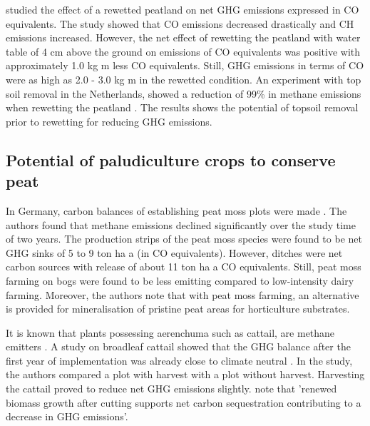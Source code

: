{%
\citet{van2013rewetting} studied the effect of a rewetted peatland on net GHG emissions expressed in CO equivalents. The study showed that CO emissions decreased drastically and CH emissions increased. However, the net effect of rewetting the peatland with water table of 4 cm above the ground on emissions of CO equivalents was positive with approximately 1.0 kg m less CO equivalents. Still, GHG emissions in terms of CO were as high as 2.0 - 3.0 kg m in the rewetted condition. An experiment with top soil removal in the Netherlands, showed a reduction of 99\% in methane emissions when rewetting the peatland \citep{harpenslager2015rewetting}. The results shows the potential of topsoil removal prior to rewetting for reducing GHG emissions. 

\subsection{Potential of paludiculture crops to conserve peat}
In Germany, carbon balances of establishing peat moss plots were made \citep{gunther2017greenhouse}. The authors found that methane emissions declined significantly over the study time of two years. The production strips of the peat moss  species were found to be net GHG sinks of 5 to 9 ton ha a (in CO equivalents). However, ditches were net carbon sources with release of about 11 ton ha a CO equivalents. Still, peat moss farming on bogs were found to be less emitting compared to low-intensity dairy farming. Moreover, the authors note that with peat moss farming, an alternative is provided for mineralisation of pristine peat areas for horticulture substrates.
 
It is known that plants possessing aerenchuma such as cattail, are methane emitters \citep{wichtmann2016paludiculture}. A study on broadleaf cattail showed that the GHG balance after the first year of implementation was already close to climate neutral \citep{guntherghgtypha}. In the study, the authors compared a plot with harvest with a plot without harvest. Harvesting the cattail proved to reduce net GHG emissions slightly. \citet{wichtmann2016paludiculture} note that 'renewed biomass growth after cutting supports net carbon sequestration contributing to a decrease in GHG emissions'. 

}
